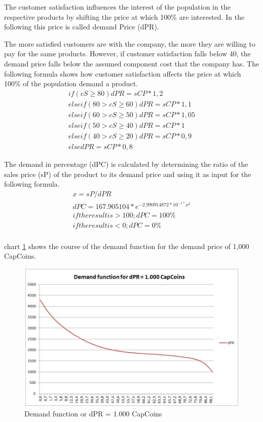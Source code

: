 The customer satisfaction influences the interest of the population in the respective products by shifting the price at which 100\% are interested. In the following this price is called demand Price (\gls{dPR}).
 
The more satisfied customers are with the company, the more they are willing to pay for the same products. However, if customer satisfaction falls below 40, the demand price falls below the assumed component cost that the company has. The following formula shows how customer satisfaction affects the price at which 100\% of the population demand a product.
\begin{equation}
\label{func:demandPrice}
\begin{aligned}
if ( cS \geq 80 ) { dPR = sCP * 1,2 } \\
elseif ( 80 > cS \geq 60 ){ dPR = sCP * 1,1 } \\
elseif ( 60 > cS \geq 50 ) { dPR = sCP * 1,05 } \\
elseif ( 50 > cS \geq 40 ) { dPR = sCP * 1 } \\
elseif ( 40 > cS \geq 20 ) { dPR = sCP * 0,9 } \\
else { dPR = sCP * 0,8 }  
\end{aligned}
\end{equation}

The demand in percentage (\gls{dPC}) is calculated by determining the ratio of the sales price (\gls{sP}) of the product to its demand price and using it as input for the following formula.
\begin{equation}
\label{func:demandPercentage}
\begin{aligned}
x = sP / dPR \\
dPC = 167.905104 * e^{−2.990914872 * 10^{ -1* } x^{ 2 } } \\
if the result is > 100; dPC = 100\% \\
if the result is < 0; dPC = 0\% \\    
\end{aligned}
\end{equation}

chart \ref{jpg:demandFunction} shows the course of the demand function for the demand price of 1,000 CapCoins. 

\begin{figure}
	\centering
	\includegraphics[width=12cm]{images/demandFunction.jpg}
	\caption{Demand function or dPR = 1.000 CapCoins}
	\label{jpg:demandFunction}
\end{figure}
 
